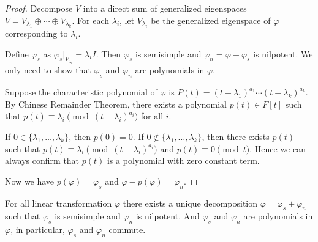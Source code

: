 \begin{proof}
    Decompose $V$ into a direct sum of generalized eigenspaces $V = V_{\lambda_1} \oplus \cdots \oplus V_{\lambda_k}$. For each $\lambda_i$, let $V_{\lambda_i}$ be the generalized eigenspace of $\varphi$ corresponding to $\lambda_i$.

    Define $\varphi_s$ as $\varphi_s |_{V_{\lambda_i}} = \lambda_i I$. Then $\varphi_s$ is semisimple and $\varphi_n = \varphi - \varphi_s$ is nilpotent. We only need to show that $\varphi_s$ and $\varphi_n$ are polynomials in $\varphi$.

    Suppose the characteristic polynomial of $\varphi$ is $P(t) = (t-\lambda_1)^{a_1} \cdots (t-\lambda_k)^{a_k}$. By Chinese Remainder Theorem, there exists a polynomial $p(t) \in F[t]$  such that $p(t) \equiv \lambda_i \pmod{(t-\lambda_i)^{a_i}}$ for all $i$.

    If $0 \in \{\lambda_1, \dots, \lambda_k\}$, then $p(0) = 0$. If $0 \notin \{\lambda_1, \dots, \lambda_k\}$, then there exists $p(t)$ such that $p(t) \equiv \lambda_i \pmod{(t-\lambda_i)^{a_i}}$ and $p(t) \equiv 0 \pmod t$. Hence we can always confirm that $p(t)$ is a polynomial with zero constant term.

    Now we have $p(\varphi) = \varphi_s$ and $\varphi - p(\varphi) = \varphi_n$.
\end{proof}

\begin{theorem}
    For all linear transformation $\varphi$ there exists a unique decomposition $\varphi=\varphi_s+\varphi_n$ such that $\varphi_s$ is semisimple and $\varphi_n$ is nilpotent. And $\varphi_s$ and $\varphi_n$ are polynomials in $\varphi$, in particular, $\varphi_s$ and $\varphi_n$ commute.
\end{theorem}


